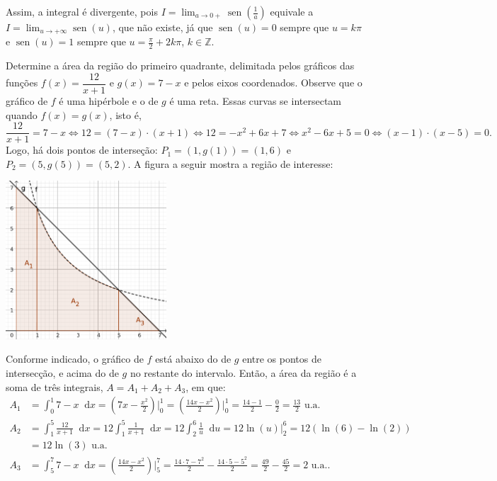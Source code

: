 \documentclass[12pt,a4paper]{article}
\newcommand*\diff{\mathop{}\!\mathrm{d}}
\newcommand*\sen{\operatorname{sen}}
\begin{document}
\begin{ExerciseList}
Assim, a integral é divergente, pois $\displaystyle I = \lim_{a\to 0+} \sen\left(\frac{1}{a}\right)$ equivale a $\displaystyle I = \lim_{u\to +\infty} \sen(u)$, que não existe, já que $\sen(u) = 0$ sempre que $u = k \pi$ e $\sen(u) = 1$ sempre que $u = \frac{\pi}{2} + 2 k \pi$, $k \in \mathbb{Z}$.


\Exercise[title={2,0}] Determine a área da região do primeiro quadrante, delimitada pelos gráficos das funções $f(x)=\dfrac{12}{x + 1}$ e $g(x)=7-x$ e pelos eixos coordenados.
\Answer Observe que o gráfico de $f$ é uma hipérbole e o de $g$ é uma reta. Essas curvas se intersectam quando $f(x) = g(x)$, isto é,
\[
  \dfrac{12}{x + 1} = 7-x
  \Leftrightarrow 12 = (7 - x) \cdot (x + 1)
  \Leftrightarrow 12 = -x^2 + 6x +7
  \Leftrightarrow x^2 - 6x + 5 = 0
  \Leftrightarrow (x - 1) \cdot(x - 5) = 0.
\]
Logo, há dois pontos de interseção: $P_1 = (1, g(1)) = (1, 6)$ e $P_2 = (5, g(5)) = (5, 2)$. A figura a seguir mostra a região de interesse:

\begin{center}
\includegraphics[width=6.0cm]{img/prova-1-nex-afim-racional-e-eixos.pdf}
\end{center}

Conforme indicado, o gráfico de $f$ está abaixo do de $g$ entre os pontos de intersecção, e acima do de $g$ no restante do intervalo. Então, a área da região é a soma de três integrais, $A = A_1 + A_2 + A_3$, em que:
\begin{align*}
  A_1 & = \int_0^1 7 - x \diff{x}
      = \left( 7x - \frac{x^2}{2} \right)\bigg\rvert_0^1
      = \left( \frac{14x - x^2}{2} \right)\bigg\rvert_0^1
      = \frac{14-1}{2} - \frac{0}{2}
      = \frac{13}{2} \text{ u.a.}\\
  A_2 & = \int_1^5 \frac{12}{x + 1} \diff{x}
        = 12 \int_1^5 \frac{1}{x + 1} \diff{x}
        = 12 \int_2^6 \frac{1}{u} \diff{u}
        = 12 \ln(u)\big\rvert_2^6
        = 12 (\ln(6) - \ln(2)) \\
      & = 12 \ln(3) \text{ u.a.}\\
  A_3 & = \int_5^7 7 - x \diff{x}
      = \left( \frac{14x - x^2}{2} \right)\bigg\rvert_5^7
      = \frac{14\cdot 7 - 7^2}{2} - \frac{14\cdot 5 - 5^2}{2}
      = \frac{49}{2} - \frac{45}{2}
      = 2 \text{ u.a.}.
\end{align*}


\end{ExerciseList}
\end{document}
